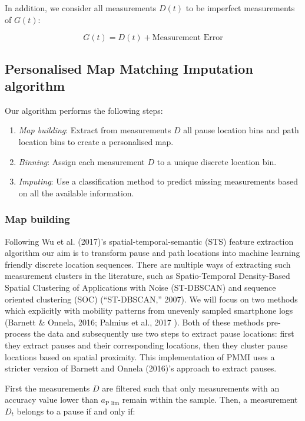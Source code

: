 \documentclass[man]{apa6}
\providecommand{\tightlist}{%
  \setlength{\itemsep}{0pt}\setlength{\parskip}{0pt}}
\theoremstyle{definition}
\theoremstyle{definition}
\theoremstyle{definition}
\theoremstyle{remark}
\begin{document}
In addition, we consider all measurements \(D(t)\) to be imperfect
measurements of \(G(t)\):

\[ G(t) = D(t) + \text{Measurement Error}  \]

\subsection{Personalised Map Matching Imputation
algorithm}\label{personalised-map-matching-imputation-algorithm}

Our algorithm performs the following steps:

\begin{enumerate}
\def\labelenumi{\arabic{enumi}.}
\tightlist
\item
  \emph{Map building}: Extract from measurements \(D\) all pause
  location bins and path location bins to create a personalised map.
\item
  \emph{Binning}: Assign each measurement \(D\) to a unique discrete
  location bin.
\item
  \emph{Imputing}: Use a classification method to predict missing
  measurements based on all the available information.
\end{enumerate}

\subsubsection{Map building}\label{map-building}

Following Wu et al. (2017)'s spatial-temporal-semantic (STS) feature
extraction algorithm our aim is to transform pause and path locations
into machine learning friendly discrete location sequences. There are
multiple ways of extracting such measurement clusters in the literature,
such as Spatio-Temporal Density-Based Spatial Clustering of Applications
with Noise (ST-DBSCAN) and sequence oriented clustering (SOC)
(``ST-DBSCAN,'' 2007). We will focus on two methods which explicitly
with mobility patterns from unevenly sampled smartphone logs (Barnett \&
Onnela, 2016; Palmius et al., 2017 ). Both of these methods pre-process
the data and subsequently use two steps to extract pause locations:
first they extract pauses and their corresponding locations, then they
cluster pause locations based on spatial proximity. This implementation
of PMMI uses a stricter version of Barnett and Onnela (2016)'s approach
to extract pauses.

First the measurements \(D\) are filtered such that only measurements
with an accuracy value lower than \(a_{\text{P lim}}\) remain within the
sample. Then, a measurement \(D_t\) belongs to a pause if and only if:
\end{document}
